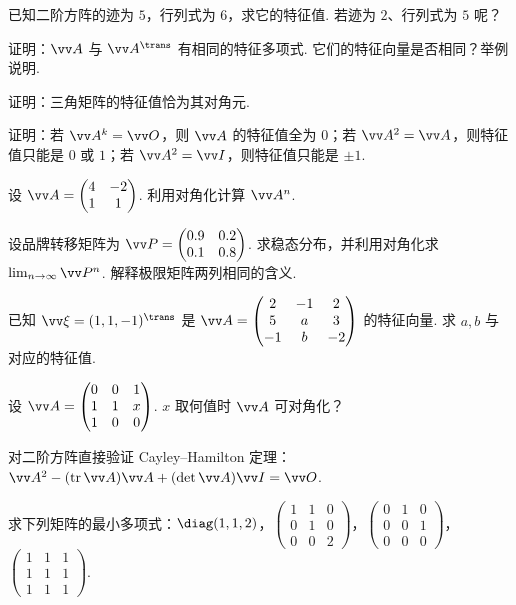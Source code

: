 {\begin{exA}
			\item\label{ex:eig:A5} 已知二阶方阵的迹为 $5$，行列式为 $6$，求它的特征值. 若迹为 $2$、行列式为 $5$ 呢？
			\item\label{ex:eig:A6} 证明：$\vv A$ 与 $\vv A^\trans$ 有相同的特征多项式. 它们的特征向量是否相同？举例说明.
			\item\label{ex:eig:A7} 证明：三角矩阵的特征值恰为其对角元.
			\item\label{ex:eig:A8} 证明：若 $\vv A^k=\vv O$，则 $\vv A$ 的特征值全为 $0$；若 $\vv A^2=\vv A$，则特征值只能是 $0$ 或 $1$；若 $\vv A^2=\vv I$，则特征值只能是 $\pm1$.
			\item\label{ex:eig:A9} 设 $\vv A=\begin{pmatrix}4&-2\\1&1\end{pmatrix}$. 利用对角化计算 $\vv A^n$.
			\item\label{ex:eig:A10} 设品牌转移矩阵为 $\vv P=\begin{pmatrix}0.9&0.2\\0.1&0.8\end{pmatrix}$. 求稳态分布，并利用对角化求 $\lim_{n\to\infty}\vv P^n$. 解释极限矩阵两列相同的含义.
			\item\label{ex:eig:A11} 已知 $\vv\xi=(1,1,-1)^\trans$ 是 $\vv A=\begin{pmatrix}2&-1&2\\5&a&3\\-1&b&-2\end{pmatrix}$ 的特征向量. 求 $a,b$ 与对应的特征值.
			\item\label{ex:eig:A12} 设 $\vv A=\begin{pmatrix}0&0&1\\1&1&x\\1&0&0\end{pmatrix}$. $x$ 取何值时 $\vv A$ 可对角化？
			\item\label{ex:eig:A13} 对二阶方阵直接验证 Cayley–Hamilton 定理：$\vv A^2-(\tr\vv A)\vv A+(\det\vv A)\vv I=\vv O$.
			\item\label{ex:eig:A14} 求下列矩阵的最小多项式：$\diag(1,1,2)$，$\begin{pmatrix}1&1&0\\0&1&0\\0&0&2\end{pmatrix}$，$\begin{pmatrix}0&1&0\\0&0&1\\0&0&0\end{pmatrix}$，$\begin{pmatrix}1&1&1\\1&1&1\\1&1&1\end{pmatrix}$.

\end{exA}}
